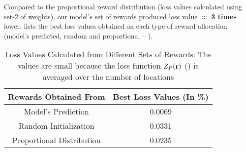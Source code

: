 Compared to the proportional reward distribution (loss values calculated using set-2 of weights), our model's set of rewards produced loss value $\approx$ \textbf{3 times} lower.  lists the best loss values obtained on each type of reward allocation (model's predicted, random and proportional -- ).
\begin{table}[!htbp]
    \centering
    \caption[Loss Values Calculated from Different Sets of Rewards]{Loss Values Calculated from Different Sets of Rewards: The values are small because the loss function $Z_P(\mathbf{r})$ () is averaged over the number of locations}
    \label{tab:Loss Values Calculated from Different Sets of Rewards}
    \begin{tabular}{|c|c|}
        \hline
        \textbf{Rewards Obtained From} & \textbf{Best Loss Values (In \%)}\\
        \hline
        Model's Prediction & 0.0069\\
        Random Initialization & 0.0331\\
        Proportional Distribution & 0.0235\\
        \hline
    \end{tabular}
\end{table}


